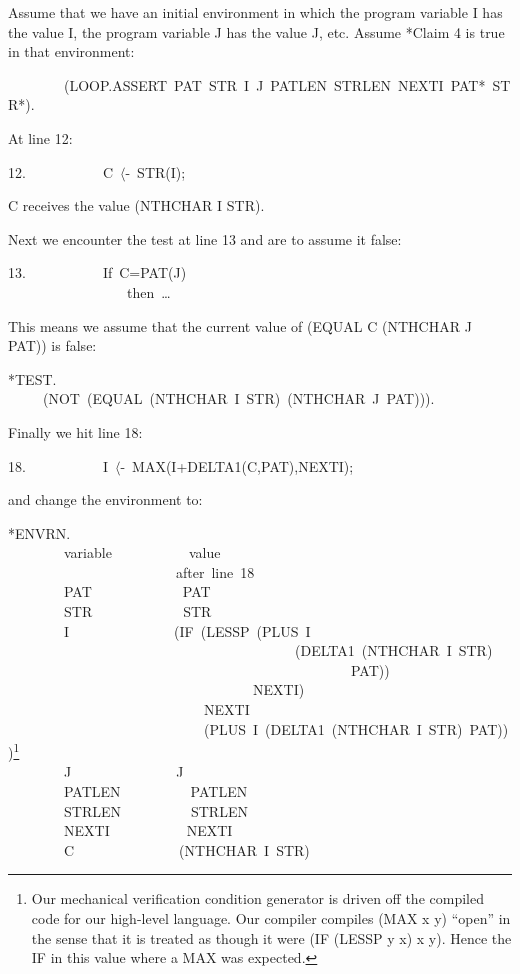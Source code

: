\documentclass[11pt]{book}
\newenvironment{pubasis}{\begin{flushleft}\ttfamily\small}{\normalsize\rmfamily\end{flushleft}}
\begin{document}
Assume that we have an initial environment in which the program variable I
has the value I, the program variable J has the value J, etc.  Assume *Claim 4
is true in that environment:
\begin{pubasis}
~~~~~~~~(LOOP.ASSERT~PAT~STR~I~J~PATLEN~STRLEN~NEXTI~PAT*~STR*).\\
\end{pubasis}
At line 12:
\begin{pubasis}
12.~~~~~~~~~~~C~$\langle$-~STR(I);\\
\end{pubasis}
C receives the value (NTHCHAR I STR).

Next we encounter the test at line 13 and are to assume it false:
\begin{pubasis}
13.~~~~~~~~~~~If~C=PAT(J)\\
~~~~~~~~~~~~~~~~~then~\ldots{}\\
\end{pubasis}
This means we assume that the current value of (EQUAL C
(NTHCHAR J PAT)) is false: 
\begin{pubasis}
*TEST.\\
~~~~~(NOT~(EQUAL~(NTHCHAR~I~STR)~(NTHCHAR~J~PAT))).\\
\end{pubasis}
Finally we hit line 18:
\begin{pubasis}
18.~~~~~~~~~~~I~$\langle$-~MAX(I+DELTA1(C,PAT),NEXTI);\\
\end{pubasis}
and change the environment to:
\begin{pubasis}
*ENVRN.\\
~~~~~~~~variable~~~~~~~~~~~value\\
~~~~~~~~~~~~~~~~~~~~~~~~after~line~18\\

~~~~~~~~PAT~~~~~~~~~~~~~PAT\\
~~~~~~~~STR~~~~~~~~~~~~~STR\\
~~~~~~~~I~~~~~~~~~~~~~~~(IF~(LESSP~(PLUS~I\\
~~~~~~~~~~~~~~~~~~~~~~~~~~~~~~~~~~~~~~~~~(DELTA1~(NTHCHAR~I~STR)\\
~~~~~~~~~~~~~~~~~~~~~~~~~~~~~~~~~~~~~~~~~~~~~~~~~PAT))\\
~~~~~~~~~~~~~~~~~~~~~~~~~~~~~~~~~~~NEXTI)\\
~~~~~~~~~~~~~~~~~~~~~~~~~~~~NEXTI\\
~~~~~~~~~~~~~~~~~~~~~~~~~~~~(PLUS~I~(DELTA1~(NTHCHAR~I~STR)~PAT)))\footnote{Our mechanical verification condition generator is driven off the compiled code for our high-level language.  Our compiler compiles (MAX x y) ``open'' in the sense that it is treated as though it were (IF (LESSP y x) x y).  Hence the IF in this value where a MAX was expected.}\\

~~~~~~~~J~~~~~~~~~~~~~~~J\\
~~~~~~~~PATLEN~~~~~~~~~~PATLEN\\
~~~~~~~~STRLEN~~~~~~~~~~STRLEN\\
~~~~~~~~NEXTI~~~~~~~~~~~NEXTI\\
~~~~~~~~C~~~~~~~~~~~~~~~(NTHCHAR~I~STR)\\
\end{pubasis}
\end{document}
